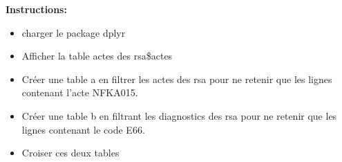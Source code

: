 \documentclass[]{book}
\begin{document}
\textbf{Instructions:}

\begin{itemize}
\item
  charger le package dplyr
\item
  Afficher la table actes des rsa\$actes
\item
  Créer une table a en filtrer les actes des rsa pour ne retenir que les
  lignes contenant l'acte NFKA015.
\item
  Créer une table b en filtrant les diagnostics des rsa pour ne retenir
  que les lignes contenant le code E66.
\item
  Croiser ces deux tables
\end{itemize}
\end{document}
